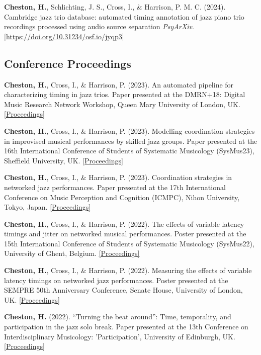 \documentclass[11pt]{res} %
\begin{document}
\begin{resume}
\begin{hangparas}{.25in}{1}
\textbf{Cheston, H.}, Schlichting, J. S., Cross, I., \& Harrison, P. M. C. (2024). Cambridge jazz trio database: automated timing annotation of jazz piano trio recordings processed using audio source separation \emph{PsyArXiv}. \href{https://doi.org/10.31234/osf.io/jyqp3}{[https://doi.org/10.31234/osf.io/jyqp3]}
\end{hangparas}

\subsection{Conference Proceedings}
\begin{hangparas}{.25in}{1}
\textbf{Cheston, H.}, Cross, I., \& Harrison, P. (2023). An automated pipeline for characterizing timing in jazz trios. Paper presented at the DMRN+18: Digital Music Research Network Workshop, Queen Mary University of London, UK. \href{https://www.qmul.ac.uk/dmrn/media/dmrn/DMRN-18-Proceedings.pdf}{[Proceedings]}

\textbf{Cheston, H.}, Cross, I., \& Harrison, P. (2023). Modelling coordination strategies in improvised musical performances by skilled jazz groups. Paper presented at the 16th International Conference of Students of Systematic Musicology (SysMus23), Sheffield University, UK. \href{https://drive.google.com/file/d/14F5Xe8qfxfWpMW6pGuIl8fcaIYbmFDtt/view}{[Proceedings]}

\textbf{Cheston, H.}, Cross, I., \& Harrison, P. (2023). Coordination strategies in networked jazz performances. Paper presented at the 17th International Conference on Music Perception and Cognition (ICMPC), Nihon University, Tokyo, Japan. \href{https://icmpc17.com/proceedings-in-zip/ICMPC17-APSCOM7-e-Proceedings.zip/}{[Proceedings]}

\textbf{Cheston, H.}, Cross, I., \& Harrison, P. (2022). The effects of variable latency timings and jitter on networked musical performances. Poster presented at the 15th International Conference of Students of Systematic Musicology (SysMus22), University of Ghent, Belgium. \href{http://hdl.handle.net/1854/LU-01GVD6WBCVPGRAHMNYR1CEXF57}{[Proceedings]}

\textbf{Cheston, H.}, Cross, I., \& Harrison, P. (2022). Measuring the effects of variable latency timings on networked jazz performances. Poster presented at the SEMPRE 50th Anniversary Conference, Senate House, University of London, UK. \href{https://drive.google.com/file/d/1P72Orm1gqSI4_gOah3Ueb9fdCpriVY_M/view}{[Proceedings]}

\textbf{Cheston, H.} (2022). “Turning the beat around”: Time, temporality, and participation in the jazz solo break. Paper presented at the 13th Conference on Interdisciplinary Musicology: 'Participation', University of Edinburgh, UK. \href{http://journals.ed.ac.uk/CIM22-Proceedings}{[Proceedings]}
\end{hangparas}


\end{resume}
\end{document}
